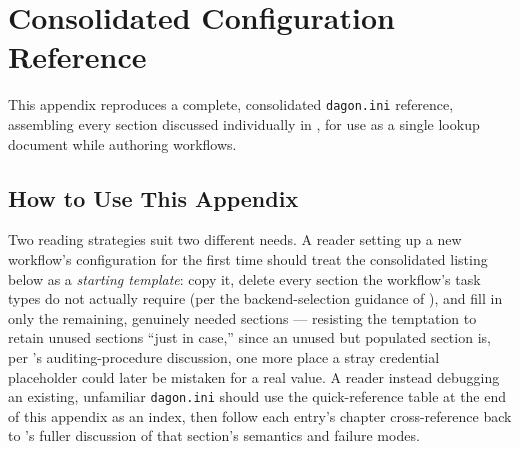 \chapter{Consolidated Configuration Reference}
\label{app:configuration}

This appendix reproduces a complete, consolidated \texttt{dagon.ini}
reference, assembling every section discussed individually in
, for use as a single lookup document while authoring
workflows.

\section{How to Use This Appendix}

Two reading strategies suit two different needs. A reader setting up a new
workflow's configuration for the first time should treat the consolidated
listing below as a \emph{starting template}: copy it, delete every section
the workflow's task types do not actually require (per the
backend-selection guidance of ), and fill in
only the remaining, genuinely needed sections --- resisting the temptation
to retain unused sections ``just in case,'' since an unused but populated
section is, per 's auditing-procedure discussion,
one more place a stray credential placeholder could later be mistaken for a
real value. A reader instead debugging an existing, unfamiliar
\texttt{dagon.ini} should use the quick-reference table at the end of this
appendix as an index, then follow each entry's chapter cross-reference back
to 's fuller discussion of that section's semantics
and failure modes.

